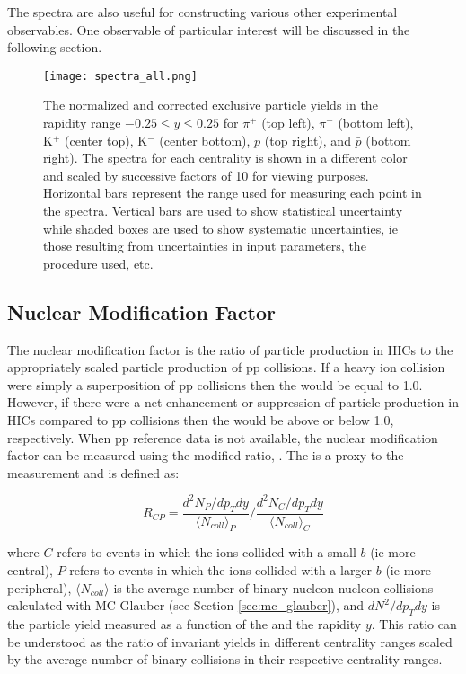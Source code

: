 	The spectra are also useful for constructing various other experimental observables. One observable of particular interest will be discussed in the following section.

	\begin{sidewaysfigure}[ht]
		\centering 
		\texttt{[image: spectra\_all.png]} 

		\centering
		\caption{ \label{fig:spectra} The normalized and corrected exclusive particle yields in the rapidity range $-0.25 \leq y \leq 0.25 $ for $\pi^{+}$ (top left), $\pi^{-}$ (bottom left), K$^{+}$ (center top), K$^-$ (center bottom), $p$ (top right), and $\bar{p}$ (bottom right). The spectra for each centrality is shown in a different color and scaled by successive factors of 10 for viewing purposes. Horizontal bars represent the \pt range used for measuring each point in the spectra. Vertical bars are used to show statistical uncertainty while shaded boxes are used to show systematic uncertainties, ie those resulting from uncertainties in input parameters, the procedure used, etc. } 
	\end{sidewaysfigure}

	\subsection{Nuclear Modification Factor}
	\label{sec:rcp}
	The nuclear modification factor \raa is the ratio of particle production in HICs to the appropriately scaled particle production of pp collisions. If a heavy ion collision were simply a superposition of pp collisions then the \raa would be equal to 1.0. However, if there were a net enhancement or suppression of particle production in HICs compared to pp collisions then the \raa would be above or below 1.0, respectively. When pp reference data is not available, the nuclear modification factor can be measured using the modified ratio, \rcp. The \rcp is a proxy to the \raa measurement and is defined as:

	\begin{equation}
		R_{CP} = \frac{d^2 N_{P} / dp_{T}dy}{\langle N_{coll} \rangle_{P}} 
				\Big/ \frac{d^2 N_{C} / dp_{T}dy}{\langle N_{coll} \rangle_{C}}
		\label{eq:r_cp}
	\end{equation}

	\noindent
	where $C$ refers to events in which the ions collided with a small $b$ (ie more central), $P$ refers to events in which the ions collided with a larger $b$ (ie more peripheral), $\langle N_{coll} \rangle $ is the average number of binary nucleon-nucleon collisions calculated with MC Glauber (see Section \ref{sec:mc_glauber}), and $dN^2/dp_T dy$ is the particle yield measured as a function of the \pt and the rapidity $y$. This ratio can be understood as the ratio of invariant yields in different centrality ranges scaled by the average number of binary collisions in their respective centrality ranges.

